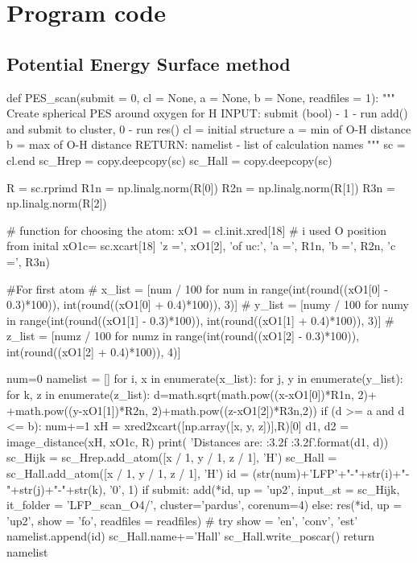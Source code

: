 
\chapter{Program code}


\section{Potential Energy Surface method}
\begin{verbnobox}[\rmfamily]
def PES_scan(submit = 0, cl = None, a = None, b = None, readfiles = 1):
    """
    Create spherical PES around oxygen for H 
    INPUT:
    submit (bool) - 1 - run add() and submit to cluster, 0 - run res()
    cl = initial structure
    a = min of O-H distance
    b = max of O-H distance
    RETURN:
    namelist - list of calculation names
    """
    sc = cl.end
    sc_Hrep = copy.deepcopy(sc)
    sc_Hall = copy.deepcopy(sc)

    R = sc.rprimd
    R1n = np.linalg.norm(R[0])
    R2n = np.linalg.norm(R[1])
    R3n = np.linalg.norm(R[2])

    # function for choosing the atom:
    xO1 = cl.init.xred[18] # i used O position from inital
    xO1c= sc.xcart[18] 
    'z =', xO1[2], '\nParemeters of uc:', 'a =', R1n, 'b =', R2n, 'c =', R3n)
    
    #For first atom
    # x_list = [num / 100 for num in range(int(round((xO1[0] - 0.3)*100)), 
    int(round((xO1[0] + 0.4)*100)), 3)]
    # y_list = [numy / 100 for numy in range(int(round((xO1[1] - 0.3)*100)),
    int(round((xO1[1] + 0.4)*100)), 3)]
    # z_list = [numz / 100 for numz in range(int(round((xO1[2] - 0.3)*100)), 
    int(round((xO1[2] + 0.4)*100)), 4)]
    
    num=0
    namelist = []
    for i, x in enumerate(x_list):
        for j, y in enumerate(y_list):
            for k, z in enumerate(z_list):
                d=math.sqrt(math.pow((x-xO1[0])*R1n, 2)+
                +math.pow((y-xO1[1])*R2n, 2)+math.pow((z-xO1[2])*R3n,2))
                if (d >= a and d <= b):
                    num+=1
                    xH = xred2xcart([np.array([x, y, z])],R)[0]
                    d1, d2 = image_distance(xH, xO1c, R)
                    print( 'Distances are: {:3.2f} {:3.2f}'.format(d1, d))
                    sc_Hijk = sc_Hrep.add_atom([x / 1, y / 1, z / 1], 'H')
                    sc_Hall = sc_Hall.add_atom([x / 1, y / 1, z / 1], 'H')
                    id  = (str(num)+'LFP'+"-"+str(i)+"-"+str(j)+"-"+str(k), 
                    '0', 1)
                    if submit:
                        add(*id, up = 'up2', input_st = sc_Hijk, it_folder = 
                        'LFP_scan_O4/', cluster='pardus', corenum=4)
                    else:
                        res(*id, up = 'up2', show = 'fo', readfiles = readfiles) 
                        # try show = 'en', 'conv', 'est'
                    namelist.append(id)
    sc_Hall.name+='Hall'
    sc_Hall.write_poscar()
    return namelist
\end{verbnobox}    
    
